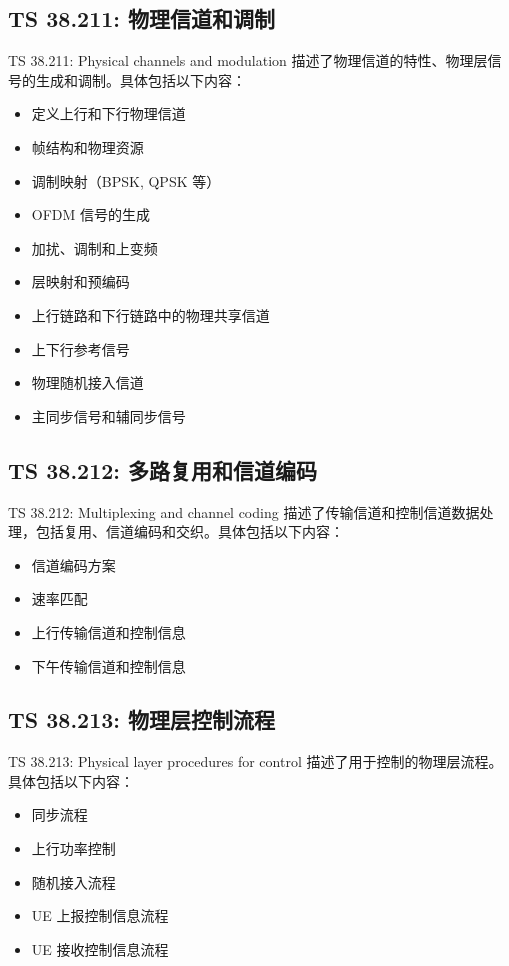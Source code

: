 \documentclass[cn,hazy,blue,14pt,screen,device=normal]{elegantnote}
\begin{document}
\subsection{TS 38.211: 物理信道和调制}
TS 38.211: Physical channels and modulation 描述了物理信道的特性、物理层信号的生成和调制。具体包括以下内容：
\begin{itemize}[leftmargin=2cm]
	\item 定义上行和下行物理信道
	\item 帧结构和物理资源
	\item 调制映射（BPSK, QPSK 等）
	\item OFDM 信号的生成
	\item 加扰、调制和上变频
	\item 层映射和预编码
	\item 上行链路和下行链路中的物理共享信道
	\item 上下行参考信号
	\item 物理随机接入信道
	\item 主同步信号和辅同步信号
\end{itemize}

\subsection{TS 38.212: 多路复用和信道编码}
TS 38.212: Multiplexing and channel coding 描述了传输信道和控制信道数据处理，包括复用、信道编码和交织。具体包括以下内容：
\begin{itemize}[leftmargin=2cm]
	\item 信道编码方案
	\item 速率匹配
	\item 上行传输信道和控制信息
	\item 下午传输信道和控制信息
\end{itemize}

\subsection{TS 38.213: 物理层控制流程}
TS 38.213: Physical layer procedures for control 描述了用于控制的物理层流程。具体包括以下内容：
\begin{itemize}[leftmargin=2cm]
	\item 同步流程
	\item 上行功率控制
	\item 随机接入流程
	\item UE 上报控制信息流程
	\item UE 接收控制信息流程
\end{itemize}
\end{document}
